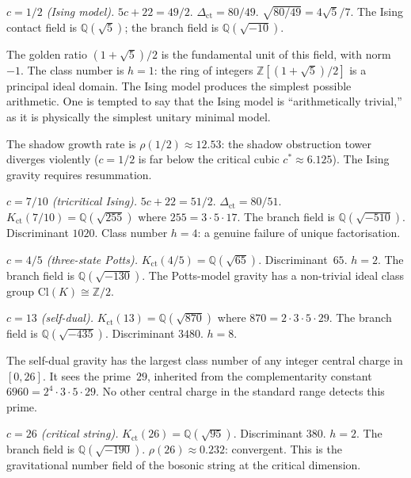 \documentclass[11pt]{article}
\newcommand{\Z}{\mathbb{Z}}
\newcommand{\Q}{\mathbb{Q}}
\begin{document}
\medskip

\noindent\textit{$c = 1/2$ (Ising model).}\enspace
$5c + 22 = 49/2$.  $\Delta_{\mathrm{ct}} = 80/49$.
$\sqrt{80/49} = 4\sqrt{5}/7$.
The Ising contact field is $\Q(\sqrt{5})$; the branch field is
$\Q(\sqrt{-10})$.

The golden ratio $(1+\sqrt{5})/2$ is the fundamental unit
of this field, with norm $-1$.  The class number is $h = 1$:
the ring of integers $\Z[(1+\sqrt{5})/2]$ is a principal ideal
domain.  The Ising model produces the simplest possible
arithmetic.  One is tempted to say that the Ising model is
``arithmetically trivial,'' as it is physically the simplest
unitary minimal model.

The shadow growth rate is $\rho(1/2) \approx 12.53$: the
shadow obstruction tower diverges violently ($c = 1/2$ is far below
the critical cubic $c^* \approx 6.125$).  The Ising gravity
requires resummation.

\medskip

\noindent\textit{$c = 7/10$ (tricritical Ising).}\enspace
$5c + 22 = 51/2$.  $\Delta_{\mathrm{ct}} = 80/51$.
$K_{\mathrm{ct}}(7/10) = \Q(\sqrt{255})$ where $255 = 3 \cdot 5 \cdot 17$.
The branch field is $\Q(\sqrt{-510})$.
Discriminant $1020$.  Class number $h = 4$: a genuine failure
of unique factorisation.

\medskip

\noindent\textit{$c = 4/5$ (three-state Potts).}\enspace
$K_{\mathrm{ct}}(4/5) = \Q(\sqrt{65})$.  Discriminant~$65$.  $h = 2$.
The branch field is $\Q(\sqrt{-130})$.
The Potts-model gravity has a non-trivial ideal class group
$\mathrm{Cl}(K) \cong \Z/2$.

\medskip

\noindent\textit{$c = 13$ (self-dual).}\enspace
$K_{\mathrm{ct}}(13) = \Q(\sqrt{870})$ where $870 = 2 \cdot 3 \cdot 5 \cdot 29$.
The branch field is $\Q(\sqrt{-435})$.
Discriminant $3480$.  $h = 8$.

The self-dual gravity has the largest class number of any
integer central charge in $[0, 26]$.  It sees the prime~$29$,
inherited from the complementarity constant
$6960 = 2^4 \cdot 3 \cdot 5 \cdot 29$.  No other central
charge in the standard range detects this prime.

\medskip

\noindent\textit{$c = 26$ (critical string).}\enspace
$K_{\mathrm{ct}}(26) = \Q(\sqrt{95})$.  Discriminant $380$.  $h = 2$.
The branch field is $\Q(\sqrt{-190})$.
$\rho(26) \approx 0.232$: convergent.  This is the
gravitational number field of the bosonic string at the
critical dimension.
\end{document}
